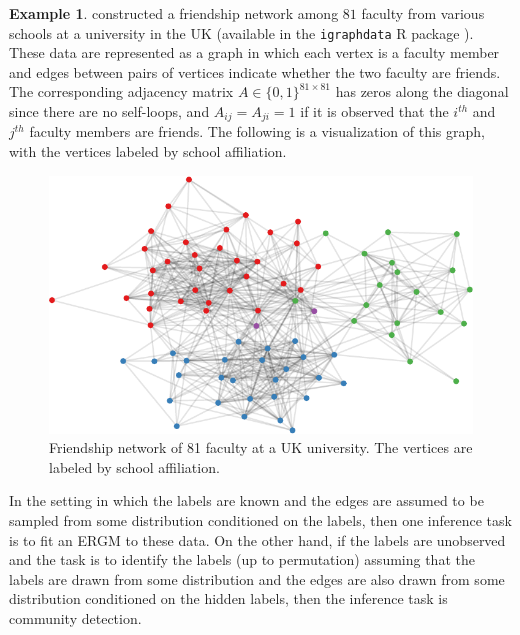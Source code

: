 \documentclass[
  12pt,
]{article}
\theoremstyle{definition}
\theoremstyle{definition}
\newtheorem{example}{Example}[section]
\theoremstyle{definition}
\theoremstyle{definition}
\theoremstyle{remark}
\begin{document}
\begin{example}
\label{ex:uk-faculty}
\citet{PhysRevE.77.016107} constructed a friendship network among $81$ faculty from various schools at a university in the UK (available in the \texttt{igraphdata} R package \citep{igraph}). 
These data are represented as a graph in which each vertex is a faculty member and edges between pairs of vertices indicate whether the two faculty are friends. 
The corresponding adjacency matrix $A \in \{0, 1\}^{81 \times 81}$ has zeros along the diagonal since there are no self-loops, and $A_{ij} = A_{ji} = 1$ if it is observed that the $i^{th}$ and $j^{th}$ faculty members are friends. 
The following is a visualization of this graph, with the vertices labeled by school affiliation. 

\begin{figure}[H]

{\centering \includegraphics{draft_files/figure-latex/friendship-network-1} 

}

\caption{Friendship network of 81 faculty at a UK university. The vertices are labeled by school affiliation.}\label{fig:friendship-network}
\end{figure}

In the setting in which the labels are known and the edges are assumed to be sampled from some distribution conditioned on the labels, then one inference task is to fit an ERGM to these data. 
On the other hand, if the labels are unobserved and the task is to identify the labels (up to permutation) assuming that the labels are drawn from some distribution and the edges are also drawn from some distribution conditioned on the hidden labels, then the inference task is community detection. 

\end{example}
\end{document}
